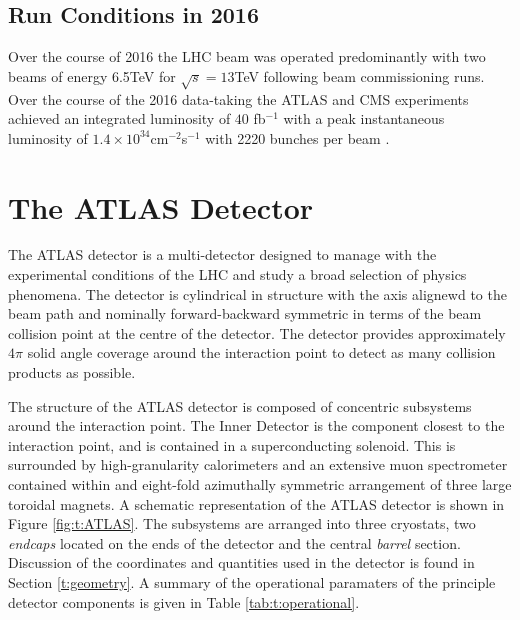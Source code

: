 	\subsection{Run Conditions in 2016}
	
	Over the course of 2016 the LHC beam was operated predominantly with two beams of energy 6.5TeV for $\sqrt{s}=13$TeV following beam commissioning runs. Over the course of the 2016 data-taking the ATLAS and CMS experiments achieved an integrated luminosity of $40$ fb$^{-1}$ with a peak instantaneous luminosity of $1.4\times10^{34}$cm$^{-2}$s$^{-1}$ with 2220 bunches per beam \cite{Run2016}. 
	

\section{The ATLAS Detector} 

	The ATLAS detector \cite{ATLAS} is a multi-detector designed to manage with the experimental conditions of the LHC and study a broad selection of physics phenomena. The detector is cylindrical in structure with the axis alignewd to the beam path and nominally forward-backward symmetric in terms of the beam collision point at the centre of the detector. The detector provides approximately $4\pi$ solid angle coverage around the interaction point to detect as many collision products as possible. 

	The structure of the ATLAS detector is composed of concentric subsystems around the interaction point.  The Inner Detector is the component closest to the interaction point, and is contained in a superconducting solenoid. This is surrounded by high-granularity calorimeters and an extensive muon spectrometer contained within and eight-fold azimuthally symmetric arrangement of three large toroidal magnets. A schematic representation of the ATLAS detector is shown in Figure \ref{fig:t:ATLAS}. 	The subsystems are arranged into three cryostats, two \textit{endcaps} located on the ends of the detector and the central \textit{barrel} section. Discussion of the coordinates and quantities used in the detector is found in Section \ref{t:geometry}. A summary of the operational paramaters of the principle detector components is given in Table \ref{tab:t:operational}.
	

